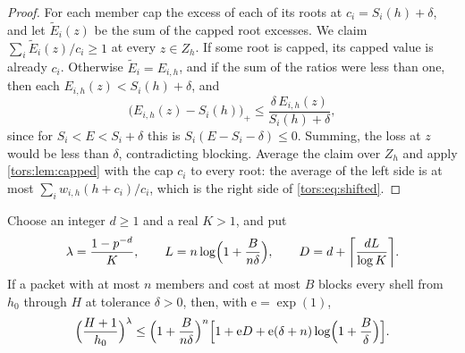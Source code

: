 \begin{proof}
For each member cap the excess of each of its roots at $c_i=S_i(h)+\delta$, and let
$\widetilde E_i(z)$ be the sum of the capped root excesses. We claim
$\sum_i\widetilde E_i(z)/c_i\ge1$ at every $z\in Z_h$. If some root is capped, its capped
value is already $c_i$. Otherwise $\widetilde E_i=E_{i,h}$, and if the sum of the ratios
were less than one, then each $E_{i,h}(z)<S_i(h)+\delta$, and
\[
 \bigl(E_{i,h}(z)-S_i(h)\bigr)_+\le\frac{\delta\,E_{i,h}(z)}{S_i(h)+\delta},
\]
since for $S_i<E<S_i+\delta$ this is $S_i(E-S_i-\delta)\le0$. Summing, the loss at $z$ would
be less than $\delta$, contradicting blocking. Average the claim over $Z_h$ and apply
\cref{tors:lem:capped} with the cap $c_i$ to every root: the average of the left side is at
most $\sum_iw_{i,h}(h+c_i)/c_i$, which is the right side of \eqref{tors:eq:shifted}.
\end{proof}

\begin{proposition}\label{tors:prop:shifted}
Choose an integer $d\ge1$ and a real $K>1$, and put
\[
 \lambda=\frac{1-p^{-d}}K,\qquad L=n\log\Bigl(1+\frac B{n\delta}\Bigr),\qquad
 D=d+\ceil*{\frac{dL}{\log K}} .
\]
If a packet with at most $n$ members and cost at most $B$ blocks every shell from $h_0$
through $H$ at tolerance $\delta>0$, then, with $\mathrm e=\exp(1)$,
\begin{equation}\label{tors:eq:cardposexplicit}
 \Bigl(\frac{H+1}{h_0}\Bigr)^\lambda\le\Bigl(1+\frac B{n\delta}\Bigr)^n
 \Bigl[1+\mathrm eD+\mathrm e(\delta+n)\log\Bigl(1+\frac B\delta\Bigr)\Bigr].
\end{equation}
\end{proposition}

